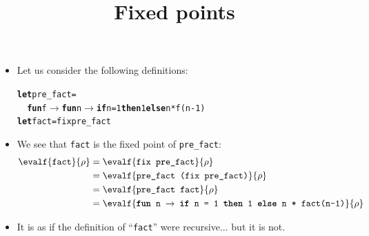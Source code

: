 \documentclass[wide]{slides}
\begin{document}
\begin{slide}
  \title{Fixed points}

  \begin{itemize}


    \item Let us consider the following definitions:
    \smallskip
\begin{alltt}
\textbf{let} pre\_fact =
\ \ \textbf{fun} f \(\rightarrow\) \textbf{fun} n \(\rightarrow\) \textbf{if} n = 1 \textbf{then} 1 \textbf{else} n * f(n-1)
\textbf{let} fact = fix pre\_fact
\end{alltt}

    \item We see that \texttt{fact} is the fixed point of
      \texttt{pre\_fact}:
      \smallskip
      \begin{align*}
        \evalf{\texttt{fact}}{\rho} &= \evalf{\texttt{fix
            pre\_fact}}{\rho}\\
        &= \evalf{\texttt{pre\_fact (fix pre\_fact)}}{\rho}\\
        &= \evalf{\texttt{pre\_fact fact}}{\rho}\\
        &= \evalf{\texttt{\textbf{fun} n \(\rightarrow\) \textbf{if} n
            = 1 \textbf{then} 1 \textbf{else} n * fact(n-1)}}{\rho}
      \end{align*}

    \item It is as if the definition of ``\texttt{fact}'' were
      recursive... but it is not.

  \end{itemize}

\end{slide}
\end{document}
